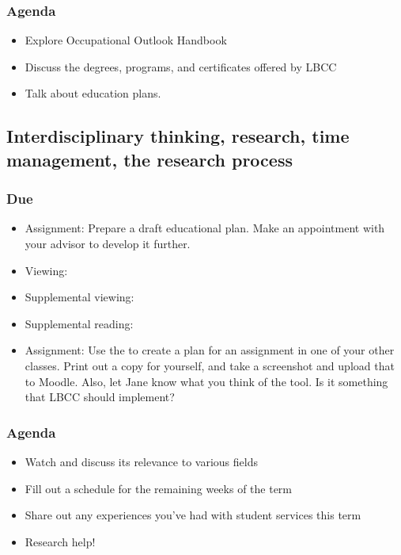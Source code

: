 \documentclass[12pt,article,oneside]{memoir}
\begin{document}
\subsubsection{Agenda}
\begin{itemize}
 \item Explore Occupational Outlook Handbook
 \item Discuss the degrees, programs, and certificates offered by LBCC
\item Talk about education plans.
\end{itemize}



\subsection{Interdisciplinary thinking, research, time management, the research process}
\subsubsection{Due}
\begin{itemize}
 \item Assignment: Prepare a draft educational plan.  Make an appointment with your advisor to develop it further.
 \item Viewing: \cite{decipher}
 \item Supplemental viewing: \cite{incorporating}
 \item Supplemental reading: \cite{gen-ed}
 \item Assignment: Use the  to create a plan for an assignment in one of your other classes.  Print out a copy for yourself, and take a screenshot and upload that to Moodle.  Also, let Jane know what you think of the tool. Is it something that LBCC should implement?
\end{itemize}


\subsubsection{Agenda}
\begin{itemize}
 \item Watch \cite{lasers} and discuss its relevance to various fields
 \item Fill out a schedule for the remaining weeks of the term
 \item Share out any experiences you've had with student services this term
 \item Research help!
\end{itemize}
\end{document}

